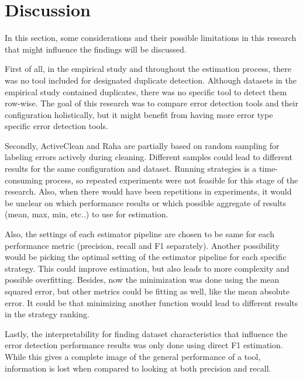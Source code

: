 \chapter{Discussion}
\label{chap:discussion}


% 

In this section, some considerations and their possible limitations in this research that might influence the findings will be discussed. 

First of all, in the empirical study and throughout the estimation process, there was no tool included for designated duplicate detection. Although datasets in the empirical study contained duplicates, there was no specific tool to detect them row-wise. The goal of this research was to compare error detection tools and their configuration holistically, but it might benefit from having more error type specific error detection tools.

Secondly, ActiveClean and Raha are partially based on random sampling for labeling errors actively during cleaning. Different samples could lead to different results for the same configuration and dataset. Running strategies is a time-consuming process, so repeated experiments were not feasible for this stage of the research. Also, when there would have been repetitions in experiments, it would be unclear on which performance results or which possible aggregate of results (mean, max, min, etc..) to use for estimation. 

Also, the settings of each estimator pipeline are chosen to be same for each performance metric (precision, recall and F1 separately). Another possibility would be picking the optimal setting of the estimator pipeline for each specific strategy. This could improve estimation, but also leads to more complexity and possible overfitting. Besides, now the minimization was done using the mean squared error, but other metrics could be fitting as well, like the mean absolute error. It could be that minimizing another function would lead to different results in the strategy ranking. 

Lastly, the interpretability for finding dataset characteristics that influence the error detection performance results was only done using direct F1 estimation. While this gives a complete image of the general performance of a tool, information is lost when compared to looking at both precision and recall. 